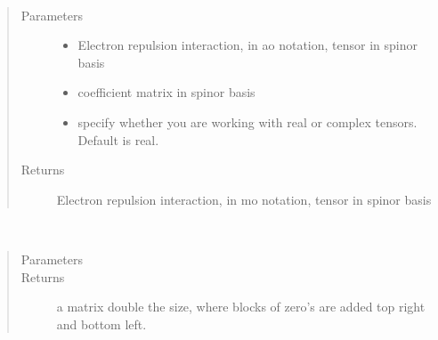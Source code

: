 \documentclass[letterpaper,10pt,english]{sphinxmanual}
\begin{document}

\begin{fulllineitems}
\label{\detokenize{SCF_functions:ghf.SCF_functions.eri_ao_to_mo}}~\begin{quote}\begin{description}
\item[{Parameters}] \leavevmode\begin{itemize}
\item {} 
 \textendash{} Electron repulsion interaction, in ao notation, tensor in spinor basis

\item {} 
 \textendash{} coefficient matrix in spinor basis

\item {} 
 \textendash{} specify whether you are working with real or complex tensors. Default is real.

\end{itemize}

\item[{Returns}] \leavevmode
Electron repulsion interaction, in mo notation, tensor in spinor basis

\end{description}\end{quote}

\end{fulllineitems}


\begin{fulllineitems}
\label{\detokenize{SCF_functions:ghf.SCF_functions.expand_matrix}}~\begin{quote}\begin{description}
\item[{Parameters}] \leavevmode
{} \textendash{} 

\item[{Returns}] \leavevmode
a matrix double the size, where blocks of zero’s are added top right and bottom left.

\end{description}\end{quote}

\end{fulllineitems}
\end{document}
